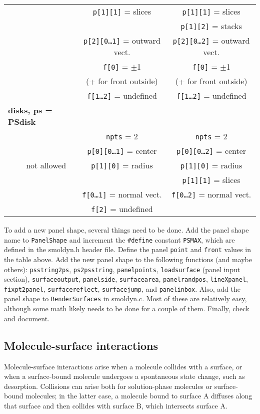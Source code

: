 \documentclass {book}
\begin{document}
\begin{longtable}[c]{lccc}
&&\texttt{p[1][1]} = slices&\texttt{p[1][1]} = slices\\ 
&&&\texttt{p[1][2]} = stacks\\ 
&&\texttt{p[2][0\ldots1]} = outward vect.&\texttt{p[2][0\ldots2]} = outward vect.\\ 
&&\texttt{f[0]} = $\pm$1&\texttt{f[0]} = $\pm$1\\ 
&&(+ for front outside)&(+ for front outside)\\ 
&&\texttt{f[1\ldots2]} = undefined&\texttt{f[1\ldots2]} = undefined\\
\hline
\multicolumn{2}{l}{\textbf{disks, ps = PSdisk}}\\
&&\texttt{npts} = 2&\texttt{npts} = 2\\ 
&&\texttt{p[0][0\ldots1]} = center&\texttt{p[0][0\ldots2]} = center\\ 
&not allowed&\texttt{p[1][0]} = radius&\texttt{p[1][0]} = radius\\ 
&&&\texttt{p[1][1]} = slices\\ 
&&\texttt{f[0\ldots1]} = normal vect.&\texttt{f[0\ldots2]} = normal vect.\\ 
&&\texttt{f[2]} = undefined&\\

\end{longtable}

To add a new panel shape, several things need to be done. Add the panel shape name to \texttt{PanelShape} and increment the \texttt{\#define} constant \texttt{PSMAX}, which are defined in the smoldyn.h header file. Define the panel \texttt{point} and \texttt{front} values in the table above. Add the new panel shape to the following functions (and maybe others): \texttt{psstring2ps}, \texttt{ps2psstring}, \texttt{panelpoints}, \texttt{loadsurface} (panel input section), \texttt{surfaceoutput}, \texttt{panelside}, \texttt{surfacearea}, \texttt{panelrandpos}, \texttt{lineXpanel}, \texttt{fixpt2panel}, \texttt{surfacereflect}, \texttt{surfacejump}, and \texttt{panelinbox}. Also, add the panel shape to \texttt{RenderSurfaces} in smoldyn.c. Most of these are relatively easy, although some math likely needs to be done for a couple of them. Finally, check and document.

\subsection*{Molecule-surface interactions}

Molecule-surface interactions arise when a molecule collides with a surface, or when a surface-bound molecule undergoes a spontaneous state change, such as desorption. Collisions can arise both for solution-phase molecules or surface-bound molecules; in the latter case, a molecule bound to surface A diffuses along that surface and then collides with surface B, which intersects surface A.
\end{document}
